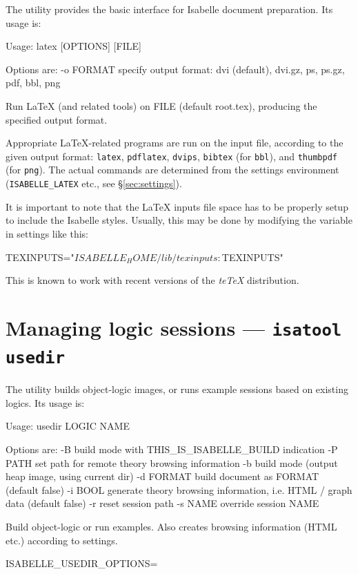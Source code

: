 The  utility provides the basic interface for Isabelle document
preparation.  Its usage is:
\begin{ttbox}
Usage: latex [OPTIONS] [FILE]

  Options are:
    -o FORMAT    specify output format: dvi (default), dvi.gz, ps,
                 ps.gz, pdf, bbl, png

  Run LaTeX (and related tools) on FILE (default root.tex),
  producing the specified output format.
\end{ttbox}
Appropriate {\LaTeX}-related programs are run on the input file, according to
the given output format: \texttt{latex}, \texttt{pdflatex}, \texttt{dvips},
\texttt{bibtex} (for \texttt{bbl}), and \texttt{thumbpdf} (for \texttt{png}).
The actual commands are determined from the settings environment
(\texttt{ISABELLE_LATEX} etc., see \S\ref{sec:settings}).

It is important to note that the {\LaTeX} inputs file space has to be properly
setup to include the Isabelle styles.  Usually, this may be done by modifying
the  variable in settings like this:
\begin{ttbox}
TEXINPUTS="$ISABELLE_HOME/lib/texinputs:$TEXINPUTS"
\end{ttbox}
This is known to work with recent versions of the \textsl{teTeX} distribution.



\section{Managing logic sessions --- \texttt{isatool usedir}} \label{sec:tool-usedir}

The  utility builds object-logic images, or runs example
sessions based on existing logics. Its usage is:
\begin{ttbox}
Usage: usedir LOGIC NAME

  Options are:
    -B           build mode with THIS_IS_ISABELLE_BUILD indication
    -P PATH      set path for remote theory browsing information
    -b           build mode (output heap image, using current dir)
    -d FORMAT    build document as FORMAT (default false)
    -i BOOL      generate theory browsing information,
                 i.e. HTML / graph data (default false)
    -r           reset session path
    -s NAME      override session NAME

  Build object-logic or run examples. Also creates browsing
  information (HTML etc.) according to settings.

  ISABELLE_USEDIR_OPTIONS=
\end{ttbox}

